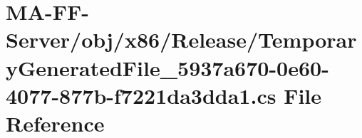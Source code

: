 \hypertarget{x86_2_release_2_temporary_generated_file__5937a670-0e60-4077-877b-f7221da3dda1_8cs}{}\section{M\+A-\/\+F\+F-\/\+Server/obj/x86/\+Release/\+Temporary\+Generated\+File\+\_\+5937a670-\/0e60-\/4077-\/877b-\/f7221da3dda1.cs File Reference}
\label{x86_2_release_2_temporary_generated_file__5937a670-0e60-4077-877b-f7221da3dda1_8cs}
